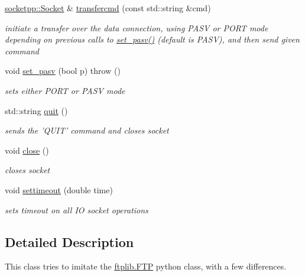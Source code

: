 \begin{CompactItemize}
\hyperlink{classsocketpp_1_1Socket}{socketpp::Socket} \& \hyperlink{classftplib_1_1FTP_c949b3cd7b92534705ff041bb43d989b}{transfercmd} (const std::string \&cmd)
\begin{CompactList}\small\item\em initiate a transfer over the data connection, using PASV or PORT mode depending on previous calls to \hyperlink{classftplib_1_1FTP_e35230239f093f01fb295ccb007de1b2}{set\_\-pasv()} (default is PASV), and then send given command \item\end{CompactList}\item 
void \hyperlink{classftplib_1_1FTP_e35230239f093f01fb295ccb007de1b2}{set\_\-pasv} (bool p)  throw ()
\begin{CompactList}\small\item\em sets either PORT or PASV mode \item\end{CompactList}\item 
std::string \hyperlink{classftplib_1_1FTP_bd6e018a5cc17b1c8007064830823c71}{quit} ()
\begin{CompactList}\small\item\em sends the 'QUIT' command and closes socket \item\end{CompactList}\item 
void \hyperlink{classftplib_1_1FTP_4f36be9f23721435f19a7e5b1d702718}{close} ()
\begin{CompactList}\small\item\em closes socket \item\end{CompactList}\item 
void \hyperlink{classftplib_1_1FTP_a6603cda3b7c44c48c6a2b8d688d3bb7}{settimeout} (double time)
\begin{CompactList}\small\item\em sets timeout on all IO socket operations \item\end{CompactList}\end{CompactItemize}


\subsection{Detailed Description}
This class tries to imitate the \hyperlink{classftplib_1_1FTP}{ftplib.FTP} python class, with a few differences. 

